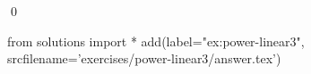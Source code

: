 
\begin{ex} 
  \label{ex:power-linear3}
  
  \qed
\end{ex} 
\begin{python0}
from solutions import *
add(label="ex:power-linear3",
    srcfilename='exercises/power-linear3/answer.tex') 
\end{python0}
